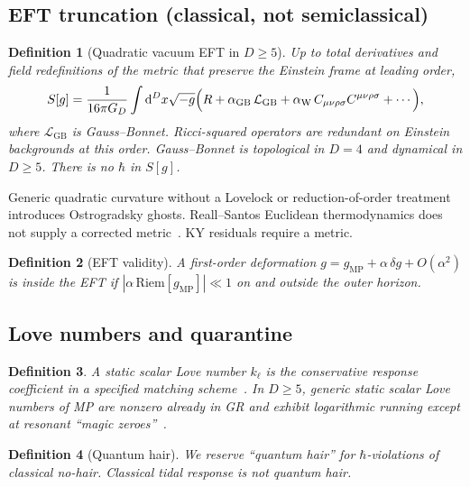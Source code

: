 \documentclass[11pt,a4paper]{article}
\newtheorem{definition}{Definition}[section]
\begin{document}
\subsection{EFT truncation (classical, not semiclassical)}

\begin{definition}[Quadratic vacuum EFT in \(D\ge5\)]
Up to total derivatives and field redefinitions of the metric that
preserve the Einstein frame at leading order,
\[
S[g]=\frac{1}{16\pi G_D}\int\mathrm{d}^D x\sqrt{-g}
\Bigl(R+\alpha_{\mathrm{GB}}\,\mathcal{L}_{\mathrm{GB}}
+\alpha_{\mathrm{W}}\,C_{\mu\nu\rho\sigma}C^{\mu\nu\rho\sigma}+\cdots\Bigr),
\]
where \(\mathcal{L}_{\mathrm{GB}}\) is Gauss--Bonnet. Ricci-squared
operators are redundant on Einstein backgrounds at this order.
Gauss--Bonnet is topological in \(D=4\) and dynamical in \(D\ge5\).
There is no \(\hbar\) in \(S[g]\).
\end{definition}

Generic quadratic curvature without a Lovelock or reduction-of-order
treatment introduces Ostrogradsky ghosts. Reall--Santos Euclidean
thermodynamics does not supply a corrected
metric~\cite{ReallSantos2019}. KY residuals require a metric.

\begin{definition}[EFT validity]
A first-order deformation \(g=g_{\mathrm{MP}}+\alpha\,\delta g+O(\alpha^2)\)
is inside the EFT if \(|\alpha\,\mathrm{Riem}[g_{\mathrm{MP}}]|\ll1\) on
and outside the outer horizon.
\end{definition}

\subsection{Love numbers and quarantine}

\begin{definition}
A static scalar Love number \(k_\ell\) is the conservative response
coefficient in a specified matching scheme~\cite{Huietal2021,CharalambousIvanov2023}.
In \(D\ge5\), generic static scalar Love numbers of MP are
\emph{nonzero already in GR} and exhibit logarithmic running except at
resonant ``magic zeroes''~\cite{CharalambousIvanov2023}.
\end{definition}

\begin{definition}[Quantum hair]
We reserve ``quantum hair'' for \(\hbar\)-violations of classical
no-hair. Classical tidal response is not quantum hair.
\end{definition}
\end{document}
